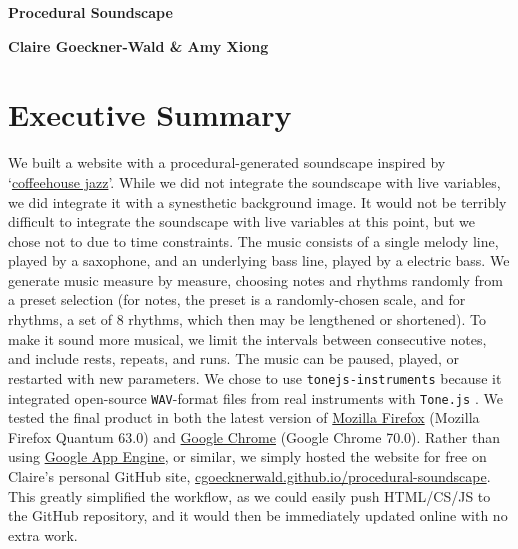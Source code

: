 \documentclass[12pt,a4paper]{article}
\newcommand{\code}{\texttt}
\newcommand{\lightcode}[1]{\colorbox{light-gray}{\texttt{#1}}}
\begin{document}
\pagestyle{plain}


\begin{center}
{\LARGE{\bf
{{Procedural Soundscape}}
}}
\end{center}
\bigskip

\centerline{\bf{Claire Goeckner-Wald \& Amy Xiong}}

\bigskip

\tableofcontents

\pagebreak
\section{Executive Summary}

We built a website with a procedural-generated soundscape inspired by `\href{https://www.youtube.com/watch?v=K2Q6YO3Ez44}{coffeehouse jazz}'. While we did not integrate the soundscape with live variables, we did integrate it with a synesthetic background image. It would not be terribly difficult to integrate the soundscape with live variables at this point, but we chose not to due to time constraints. The music consists of a single melody line, played by a saxophone, and an underlying bass line, played by a electric bass. We generate music measure by measure, choosing notes and rhythms randomly from a preset selection (for notes, the preset is a randomly-chosen scale, and for rhythms, a set of 8 rhythms, which then may be lengthened or shortened). To make it sound more musical, we limit the intervals between consecutive notes, and include rests, repeats, and runs. The music can be paused, played, or restarted with new parameters. We chose to use \lightcode{tonejs-instruments} because it integrated open-source \code{WAV}-format files from real instruments with \lightcode{Tone.js} \cite{tonejs-instruments}. We tested the final product in both the latest version of \href{https://www.mozilla.org/en-US/firefox/}{Mozilla Firefox} (Mozilla Firefox Quantum 63.0) and \href{https://www.google.com/chrome/index.html}{Google Chrome} (Google Chrome 70.0). Rather than using \href{https://cloud.google.com/appengine/}{Google App Engine}, or similar, we simply hosted the website for free on Claire's personal GitHub site, \href{https://cgoecknerwald.github.io/procedural-soundscape}{cgoecknerwald.github.io/procedural-soundscape}. This greatly simplified the workflow, as we could easily push HTML/CS/JS to the GitHub repository, and it would then be immediately updated online with no extra work.
\end{document}
